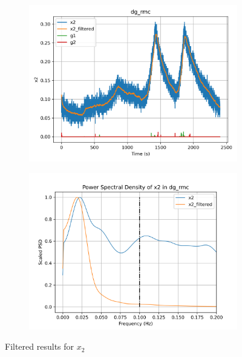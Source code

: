\begin{figure}[H]

\begin{minipage}{0.49\textwidth}
        \begin{figure}[H]
                \centering
                \includegraphics[width = \textwidth]{./figs/tst_filt/dg_rmc/x2.png}
        \end{figure}
\end{minipage}
\begin{minipage}{0.49\textwidth}
        \begin{figure}[H]
                \centering
                \includegraphics[width = \textwidth]{./figs/tst_filt/dg_rmc/x2_psd.png}
        \end{figure}
\end{minipage}
\caption{Filtered results for $x_2$}

\end{figure}


